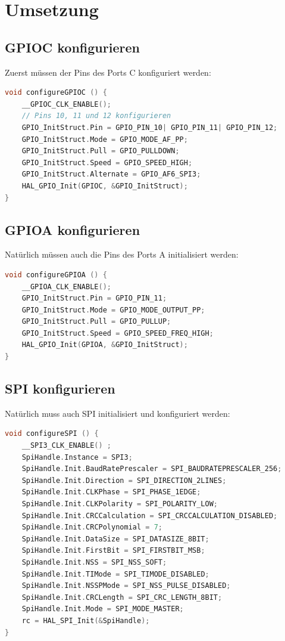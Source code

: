 \section{Umsetzung}
\subsection{GPIOC konfigurieren}
Zuerst müssen der Pins des Ports C konfiguriert werden:

\begin{lstlisting}[language=C]
void configureGPIOC () {
	__GPIOC_CLK_ENABLE();
	// Pins 10, 11 und 12 konfigurieren
	GPIO_InitStruct.Pin = GPIO_PIN_10| GPIO_PIN_11| GPIO_PIN_12;
	GPIO_InitStruct.Mode = GPIO_MODE_AF_PP;
	GPIO_InitStruct.Pull = GPIO_PULLDOWN;
	GPIO_InitStruct.Speed = GPIO_SPEED_HIGH;
	GPIO_InitStruct.Alternate = GPIO_AF6_SPI3;
	HAL_GPIO_Init(GPIOC, &GPIO_InitStruct);
}
\end{lstlisting}

\subsection{GPIOA konfigurieren}
Natürlich müssen auch die Pins des Ports A initialisiert werden:
\begin{lstlisting}[language=C]
void configureGPIOA () {
	__GPIOA_CLK_ENABLE();
	GPIO_InitStruct.Pin = GPIO_PIN_11;
	GPIO_InitStruct.Mode = GPIO_MODE_OUTPUT_PP;
	GPIO_InitStruct.Pull = GPIO_PULLUP;
	GPIO_InitStruct.Speed = GPIO_SPEED_FREQ_HIGH;
	HAL_GPIO_Init(GPIOA, &GPIO_InitStruct);
}
\end{lstlisting}

\subsection{SPI konfigurieren}
Natürlich muss auch SPI initialisiert und konfiguriert werden:

\begin{lstlisting}[language=C]
void configureSPI () {
	__SPI3_CLK_ENABLE() ;
	SpiHandle.Instance = SPI3;
	SpiHandle.Init.BaudRatePrescaler = SPI_BAUDRATEPRESCALER_256;
	SpiHandle.Init.Direction = SPI_DIRECTION_2LINES;
	SpiHandle.Init.CLKPhase = SPI_PHASE_1EDGE;
	SpiHandle.Init.CLKPolarity = SPI_POLARITY_LOW;
	SpiHandle.Init.CRCCalculation = SPI_CRCCALCULATION_DISABLED;
	SpiHandle.Init.CRCPolynomial = 7;
	SpiHandle.Init.DataSize = SPI_DATASIZE_8BIT;
	SpiHandle.Init.FirstBit = SPI_FIRSTBIT_MSB;
	SpiHandle.Init.NSS = SPI_NSS_SOFT;
	SpiHandle.Init.TIMode = SPI_TIMODE_DISABLED;
	SpiHandle.Init.NSSPMode = SPI_NSS_PULSE_DISABLED;
	SpiHandle.Init.CRCLength = SPI_CRC_LENGTH_8BIT;
	SpiHandle.Init.Mode = SPI_MODE_MASTER;
	rc = HAL_SPI_Init(&SpiHandle);
}
\end{lstlisting}

